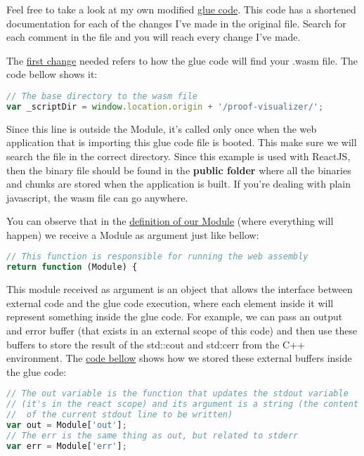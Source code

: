 \documentclass[12pt, a4paper]{article}
\begin{document}
Feel free to take a look at my own modified
\href{https://github.com/ufmg-smite/proof-visualizer/blob/main/frontend/src/wasm/cvc5.js}{glue
  code}. This code has a shortened documentation for each of the changes I've
made in the original file. Search for each comment in the file and you will
reach every change I've made.

The \href{https://github.com/ufmg-smite/proof-visualizer/blob/main/frontend/src/wasm/cvc5.js#L43}{first change} needed refers to how the glue code will find your .wasm file. The code bellow shows it:

\begin{lstlisting}[language=JavaScript]
// The base directory to the wasm file
var _scriptDir = window.location.origin + '/proof-visualizer/';
\end{lstlisting}

Since this line is outside the Module, it's called only once when the web application that is importing this glue code file is booted. This make sure we will search the file in the correct directory. Since this example is used with ReactJS, then the binary file should be found in the \textbf{public folder} where all the binaries and chunks are stored when the application is built. If you're dealing with plain javascript, the wasm file can go anywhere.

You can observe that in the \href{https://github.com/ufmg-smite/proof-visualizer/blob/main/frontend/src/wasm/cvc5.js#L45-L46}{definition of our Module} (where everything will happen) we receive a Module as argument just like bellow:

\begin{lstlisting}[language=JavaScript]
// This function is responsible for running the web assembly
return function (Module) {
\end{lstlisting}

This module received as argument is an object that allows the interface between external code and the glue code execution, where each element inside it will represent something inside the glue code. For example, we can pass an output and error buffer (that exists in an external scope of this code) and then use these buffers to store the result of the \textsf{std::cout} and \textsf{std:cerr} from the C++ environment. The \href{https://github.com/ufmg-smite/proof-visualizer/blob/main/frontend/src/wasm/cvc5.js#L116-L121}{code bellow} shows how we stored these external buffers inside the glue code:

\begin{lstlisting}[language=JavaScript]
// The out variable is the function that updates the stdout variable
// (it's in the react scope) and its argument is a string (the content
//  of the current stdout line to be written)
var out = Module['out'];
// The err is the same thing as out, but related to stderr
var err = Module['err'];
\end{lstlisting}
\end{document}
